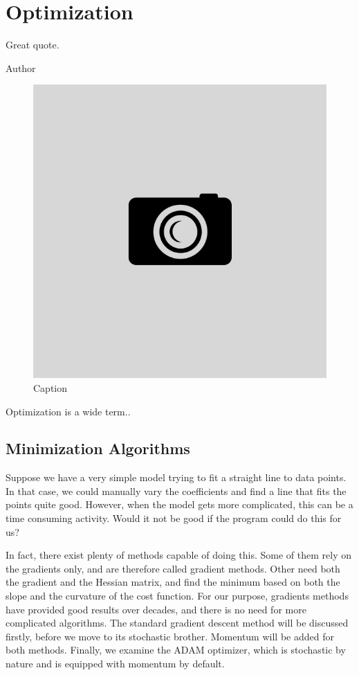 \chapter{Optimization} \label{chp:optimization}
\epigraph{Great quote.}{Author}
\begin{figure}[H]
	\centering
	\includegraphics[scale=0.4]{Images/example.png}
	\caption{Caption}
\end{figure}

Optimization is a wide term..

\newpage
\section{Minimization Algorithms}
Suppose we have a very simple model trying to fit a straight line to data points. In that case, we could manually vary the coefficients and find a line that fits the points quite good. However, when the model gets more complicated, this can be a time consuming activity. Would it not be good if the program could do this for us?

In fact, there exist plenty of methods capable of doing this. Some of them rely on the gradients only, and are therefore called gradient methods. Other need both the gradient and the Hessian matrix, and find the minimum based on both the slope and the curvature of the cost function. For our purpose, gradients methods have provided good results over decades, and there is no need for more complicated algorithms. The standard gradient descent method will be discussed firstly, before we move to its stochastic brother. Momentum will be added for both methods. Finally, we examine the ADAM optimizer, which is stochastic by nature and is equipped with momentum by default. 

